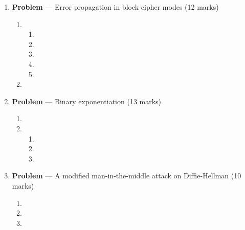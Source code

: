 \documentclass[11pt]{article}
\theoremstyle{definition}
\newcounter{problem}
\begin{document}
\begin{enumerate}
\newpage

\item[] \textbf{Problem \theproblem} --- Error propagation in block cipher modes (12 marks)

\begin{enumerate}
\item

\begin{enumerate}
\item

\item

\item

\item

\item

\end{enumerate}

\item
\end{enumerate}

\newpage


\item[] \textbf{Problem \theproblem} ---  Binary exponentiation (13 marks)

\begin{enumerate}
\item

\item
\begin{enumerate}
\item

\item

\item
\end{enumerate}
\end{enumerate}

\newpage

\item[] \textbf{Problem \theproblem} --- A modified man-in-the-middle attack on Diffie-Hellman
    (10 marks)

\begin{enumerate}
\item

\item

\item

\end{enumerate}


\end{enumerate}
\end{document}
